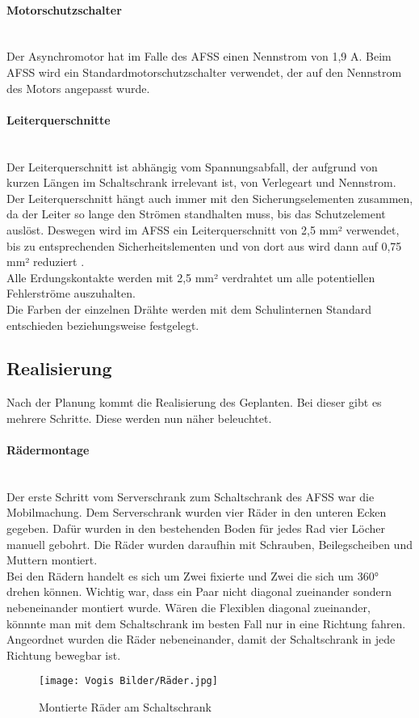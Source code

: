     \paragraph{Motorschutzschalter}\mbox{}\\
    Der Asynchromotor hat im Falle des AFSS einen Nennstrom von 1,9 A. Beim AFSS wird ein Standardmotorschutzschalter verwendet, der auf den Nennstrom des Motors angepasst wurde. 
    \paragraph{Leiterquerschnitte}\mbox{}\\
    Der Leiterquerschnitt ist abhängig vom Spannungsabfall, der aufgrund von kurzen Längen im Schaltschrank irrelevant ist, von Verlegeart und Nennstrom. Der Leiterquerschnitt hängt auch immer mit den Sicherungselementen zusammen, da der Leiter so lange den Strömen standhalten muss, bis das Schutzelement auslöst. Deswegen wird im AFSS ein Leiterquerschnitt von 2,5 mm² verwendet, bis zu entsprechenden Sicherheitslementen und von dort aus wird dann auf 0,75 mm² reduziert \cite{SeyrRösch}.\\ 
    Alle Erdungskontakte werden mit 2,5 mm² verdrahtet um alle potentiellen Fehlerströme auszuhalten.\\
    Die Farben der einzelnen Drähte werden mit dem Schulinternen Standard entschieden beziehungsweise festgelegt.
\subsection{Realisierung}
    Nach der Planung kommt die Realisierung des Geplanten. Bei dieser gibt es mehrere Schritte. Diese werden nun näher beleuchtet.
    \paragraph{Rädermontage}\mbox{}\\
    Der erste Schritt vom Serverschrank zum Schaltschrank des AFSS war die Mobilmachung. Dem Serverschrank wurden vier Räder in den unteren Ecken gegeben. Dafür wurden in den bestehenden Boden für jedes Rad vier Löcher manuell gebohrt. Die Räder wurden daraufhin mit Schrauben, Beilegscheiben und Muttern montiert.\\
    Bei den Rädern handelt es sich um Zwei fixierte und Zwei die sich um 360° drehen können. Wichtig war, dass ein Paar nicht diagonal zueinander sondern nebeneinander montiert wurde. Wären die Flexiblen diagonal zueinander, könnnte man mit dem Schaltschrank im besten Fall nur in eine Richtung fahren. Angeordnet wurden die Räder nebeneinander, damit der Schaltschrank in jede Richtung bewegbar ist.  
    \begin{figure}[h]
        \centering
        \texttt{[image: Vogis Bilder/Räder.jpg]}
        \caption{Montierte Räder am Schaltschrank}
        \label{fig:Raeder_montiert}
    \end{figure}

